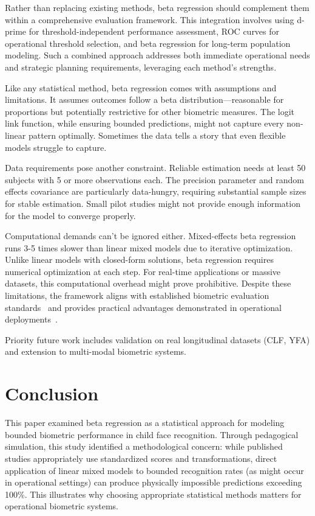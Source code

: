 \documentclass[10pt,journal,compsoc]{IEEEtran}
\begin{document}
Rather than replacing existing methods, beta regression should complement them within a comprehensive evaluation framework. This integration involves using d-prime for threshold-independent performance assessment, ROC curves for operational threshold selection, and beta regression for long-term population modeling. Such a combined approach addresses both immediate operational needs and strategic planning requirements, leveraging each method's strengths.

Like any statistical method, beta regression comes with assumptions and limitations. It assumes outcomes follow a beta distribution---reasonable for proportions but potentially restrictive for other biometric measures. The logit link function, while ensuring bounded predictions, might not capture every non-linear pattern optimally. Sometimes the data tells a story that even flexible models struggle to capture.

Data requirements pose another constraint. Reliable estimation needs at least 50 subjects with 5 or more observations each. The precision parameter and random effects covariance are particularly data-hungry, requiring substantial sample sizes for stable estimation. Small pilot studies might not provide enough information for the model to converge properly.

Computational demands can't be ignored either. Mixed-effects beta regression runs 3-5 times slower than linear mixed models due to iterative optimization. Unlike linear models with closed-form solutions, beta regression requires numerical optimization at each step. For real-time applications or massive datasets, this computational overhead might prove prohibitive. Despite these limitations, the framework aligns with established biometric evaluation standards~\cite{richiardi2011} and provides practical advantages demonstrated in operational deployments~\cite{aykac2024}.

Priority future work includes validation on real longitudinal datasets (CLF, YFA) and extension to multi-modal biometric systems.

\section{Conclusion}
\label{sec:conclusion}

This paper examined beta regression as a statistical approach for modeling bounded biometric performance in child face recognition. Through pedagogical simulation, this study identified a methodological concern: while published studies appropriately use standardized scores and transformations, direct application of linear mixed models to bounded recognition rates (as might occur in operational settings) can produce physically impossible predictions exceeding 100\%. This illustrates why choosing appropriate statistical methods matters for operational biometric systems.
\end{document}
